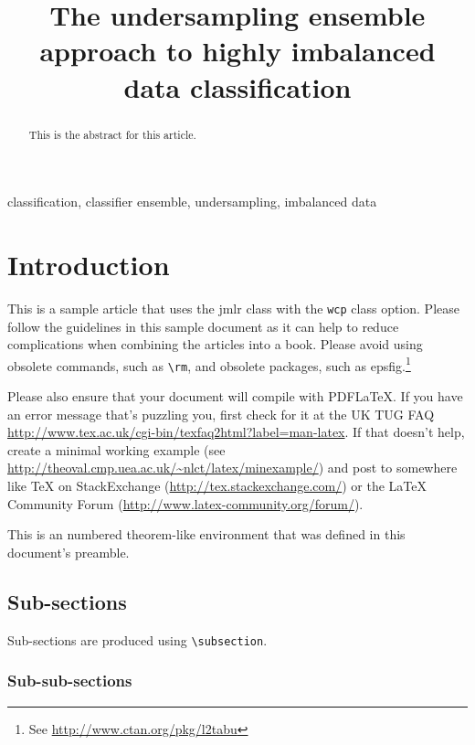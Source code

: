 \documentclass[pmlr]{jmlr}
\title
[Short Title]
{
	The undersampling ensemble approach to highly imbalanced data classification%
}
\begin{document}
\maketitle

\begin{abstract}
This is the abstract for this article.
\end{abstract}
\begin{keywords}
classification, classifier ensemble, undersampling, imbalanced data
\end{keywords}



\section{Introduction}
\label{sec:intro}

This is a sample article that uses the \textsf{jmlr} class with
the \texttt{wcp} class option.  Please follow the guidelines in
this sample document as it can help to reduce complications when
combining the articles into a book. Please avoid using obsolete
commands, such as \verb|\rm|, and obsolete packages, such as
\textsf{epsfig}.\footnote{See
\url{http://www.ctan.org/pkg/l2tabu}}

Please also ensure that your document will compile with PDF\LaTeX.
If you have an error message that's puzzling you, first check for it
at the UK TUG FAQ
\url{http://www.tex.ac.uk/cgi-bin/texfaq2html?label=man-latex}.  If
that doesn't help, create a minimal working example (see
\url{http://theoval.cmp.uea.ac.uk/~nlct/latex/minexample/}) and post
to somewhere like TeX on StackExchange
(\url{http://tex.stackexchange.com/}) or the LaTeX Community Forum
(\url{http://www.latex-community.org/forum/}).

\begin{note}
This is an numbered theorem-like environment that was defined in
this document's preamble.
\end{note}

\subsection{Sub-sections}

Sub-sections are produced using \verb|\subsection|.

\subsubsection{Sub-sub-sections}
\end{document}
